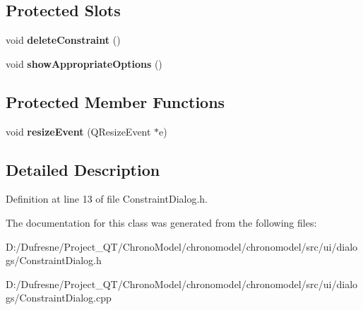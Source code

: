 \subsection*{Protected Slots}
\begin{DoxyCompactItemize}
\item 
\hypertarget{class_constraint_dialog_ac8627df807e6f8a991abb2643a52bb69}{void {\bfseries delete\-Constraint} ()}\label{class_constraint_dialog_ac8627df807e6f8a991abb2643a52bb69}

\item 
\hypertarget{class_constraint_dialog_a3903bbac1faf2b0a9fa37b04db7231a6}{void {\bfseries show\-Appropriate\-Options} ()}\label{class_constraint_dialog_a3903bbac1faf2b0a9fa37b04db7231a6}

\end{DoxyCompactItemize}
\subsection*{Protected Member Functions}
\begin{DoxyCompactItemize}
\item 
\hypertarget{class_constraint_dialog_abc712826a673a398cf9a91586d320789}{void {\bfseries resize\-Event} (Q\-Resize\-Event $\ast$e)}\label{class_constraint_dialog_abc712826a673a398cf9a91586d320789}

\end{DoxyCompactItemize}


\subsection{Detailed Description}


Definition at line 13 of file Constraint\-Dialog.\-h.



The documentation for this class was generated from the following files\-:\begin{DoxyCompactItemize}
\item 
D\-:/\-Dufresne/\-Project\-\_\-\-Q\-T/\-Chrono\-Model/chronomodel/chronomodel/src/ui/dialogs/Constraint\-Dialog.\-h\item 
D\-:/\-Dufresne/\-Project\-\_\-\-Q\-T/\-Chrono\-Model/chronomodel/chronomodel/src/ui/dialogs/Constraint\-Dialog.\-cpp\end{DoxyCompactItemize}

